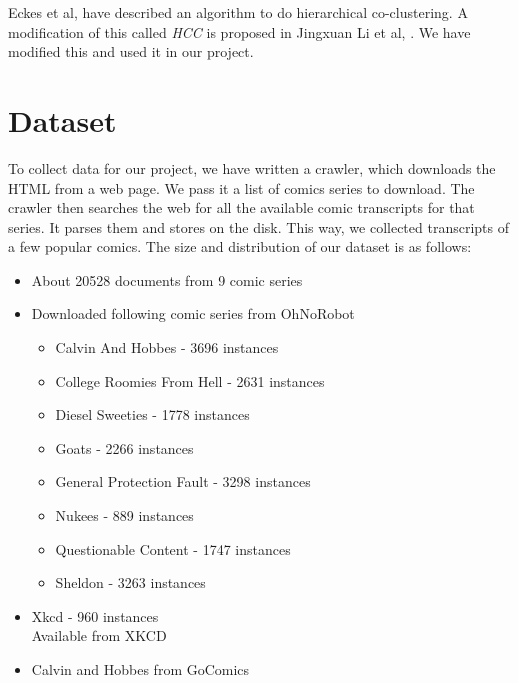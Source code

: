 \documentclass[11pt]{article}
\begin{document}
Eckes et al, \cite{HCC2} have described an algorithm to do hierarchical co-clustering. A modification of this called \emph{HCC} is proposed in Jingxuan Li et al, \cite{HCC1}. We have modified this and used it in our project.

\section{Dataset}
To collect data for our project, we have written a crawler, which downloads the HTML from a web page. We pass it a list of comics series to download. The crawler then searches the web for all the available comic transcripts for that series. It parses them and stores on the disk. This way, we collected transcripts of a few popular comics. The size and distribution of our dataset is as follows:
\begin{itemize}
\item
  About 20528 documents from 9 comic series
\item
  Downloaded following comic series from OhNoRobot\cite{robot}
  \begin{itemize}
  \item
    Calvin And Hobbes - 3696 instances
  \item
    College Roomies From Hell - 2631 instances
  \item
    Diesel Sweeties - 1778 instances
  \item
    Goats - 2266 instances
  \item
    General Protection Fault - 3298 instances
  \item
    Nukees - 889 instances
  \item
    Questionable Content -  1747 instances
  \item
    Sheldon - 3263 instances
  \end{itemize}
\item
  Xkcd - 960 instances\\
  Available from XKCD \cite{xkcd}
\item
  Calvin and Hobbes from GoComics\cite{go}
\end{itemize}
\end{document}
